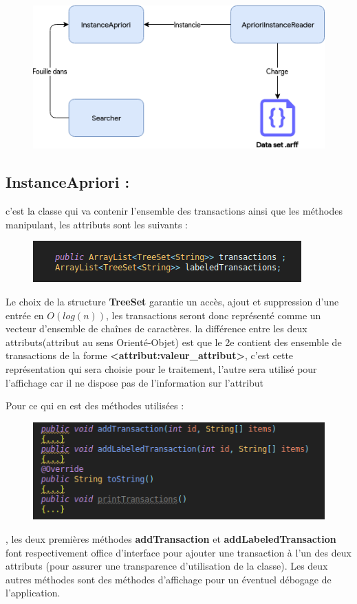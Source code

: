 			\begin{figure}[H]
				\centering
				\includegraphics[width=0.75\linewidth]{apriori/images/apriori_schema.png}
			\end{figure}
		
			\subsection{InstanceApriori : } c'est la classe qui va contenir l'ensemble des transactions ainsi que les méthodes manipulant, les attributs sont les suivants : \\
			\begin{figure}[H]
				\centering
				\includegraphics[width=0.75\linewidth]{apriori/images/data_structs/instance/properties.png}
			\end{figure}
			\par 
			Le choix de la structure \textbf{TreeSet} garantie un accès, ajout et suppression d'une entrée en $O(log(n))$, les transactions seront donc représenté comme un vecteur d'ensemble de chaînes de caractères. la différence entre les deux attributs(attribut au sens Orienté-Objet) est que le 2e contient des ensemble de transactions de la forme \textbf{<attribut:valeur\_attribut>}, c'est cette représentation qui sera choisie pour le traitement, l'autre sera utilisé pour l'affichage car il ne dispose pas de l'information sur l'attribut
			\par Pour ce qui en est des méthodes utilisées : 
			\begin{figure}[H]
				\centering
				\includegraphics[width=0.75\linewidth]{apriori/images/data_structs/instance/methods.png}
			\end{figure}
			\par, les deux premières méthodes \textbf{addTransaction} et \textbf{addLabeledTransaction} font respectivement office d'interface pour ajouter une transaction à l'un des deux attributs (pour assurer une transparence d'utilisation de la classe). Les deux autres méthodes sont des méthodes d'affichage pour un éventuel débogage de l'application.
			
